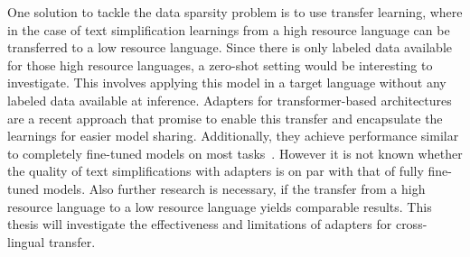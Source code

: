 One solution to tackle the data sparsity problem is to use transfer learning, where in the case of text simplification learnings from a high
resource language can be transferred to a low resource language.
Since there is only labeled data available for those high resource languages, a zero-shot setting would be interesting to investigate.
This involves applying this model in a target language without any labeled data available at inference.
Adapters for transformer-based architectures are a recent approach
that promise to enable this transfer and encapsulate the learnings for easier model sharing.
Additionally, they achieve performance similar to completely fine-tuned models on most tasks~\cite{Pfeiffer2020}.
However it is not known whether the quality of text simplifications with adapters is on par with that of fully fine-tuned models.
Also further research is necessary, if the transfer from a high resource language to a low resource language yields comparable results.
This thesis will investigate the effectiveness and limitations of adapters for cross-lingual transfer.



